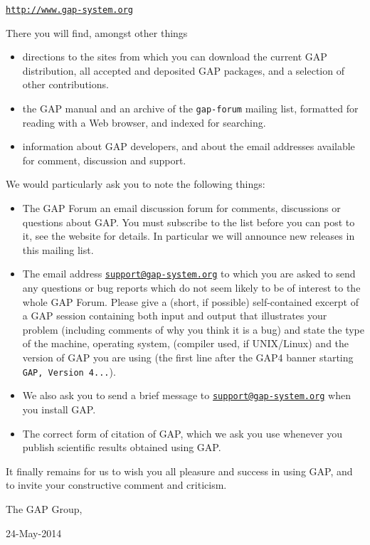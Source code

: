 \documentclass[a4paper,11pt]{report}
\begin{document}
{{ \href{http://www.gap-system.org} {\texttt{http://www.gap-system.org}} 

 There you will find, amongst other things 
\begin{itemize}
\item  directions to the sites from which you can download the current \textsf{GAP} distribution, all accepted and deposited \textsf{GAP} packages, and a selection of other contributions. 
\item  the \textsf{GAP} manual and an archive of the \texttt{gap-forum} mailing list, formatted for reading with a Web browser, and indexed for
searching. 
\item  information about \textsf{GAP} developers, and about the email addresses available for comment, discussion
and support. 
\end{itemize}
 

 

 We would particularly ask you to note the following things: 
\begin{itemize}
\item  The \textsf{GAP} Forum {\textendash} an email discussion forum for comments, discussions or
questions about \textsf{GAP}. You must subscribe to the list before you can post to it, see the website
for details. In particular we will announce new releases in this mailing list. 
\item  The email address \href{mailto://support@gap-system.org} {\texttt{support@gap-system.org}} to which you are asked to send any questions or bug reports which do not seem
likely to be of interest to the whole \textsf{GAP} Forum. Please give a (short, if possible) self-contained excerpt of a \textsf{GAP} session containing both input and output that illustrates your problem
(including comments of why you think it is a bug) and state the type of the
machine, operating system, (compiler used, if UNIX/Linux) and the version of \textsf{GAP} you are using (the first line after the \textsf{GAP}{\nobreakspace}4 banner starting \texttt{GAP, Version 4...}). 
\item  We also ask you to send a brief message to \href{mailto://support@gap-system.org} {\texttt{support@gap-system.org}} when you install \textsf{GAP}. 
\item  The correct form of citation of \textsf{GAP}, which we ask you use whenever you publish scientific results obtained using \textsf{GAP}. 
\end{itemize}
 

 It finally remains for us to wish you all pleasure and success in using \textsf{GAP}, and to invite your constructive comment and criticism. 

 

 

 The GAP Group, 

 24-May-2014    }

 }
\end{document}
